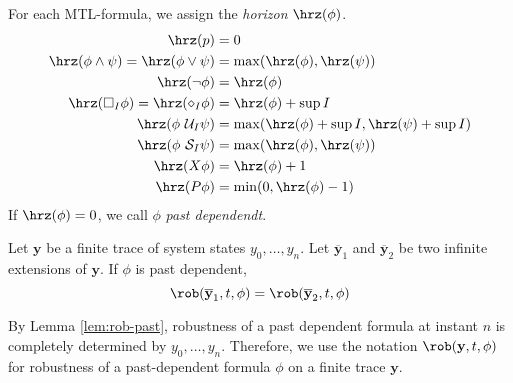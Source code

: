 \begin{definition}[Horizon]
  For each MTL-formula, we assign the \emph{horizon} $\hrz(\phi)$.
  \begin{align}
    \hrz(p) &= 0\\
    \hrz(\phi \wedge \psi) = \hrz(\phi \vee \psi) &= \max(\hrz(\phi), \hrz(\psi))\\
    \hrz(\neg \phi) &= \hrz(\phi)\\
    \hrz(\square_I \phi) = \hrz(\diamond_I \phi) &= \hrz(\phi) + \sup I\\
    \hrz(\phi \ \mathcal{U}_I \psi) &= \max(\hrz(\phi) + \sup I, \hrz(\psi) + \sup I)\\
    \hrz(\phi \ \mathcal{S}_I \psi) &= \max(\hrz(\phi), \hrz(\psi))\\
    \hrz(X\phi) &= \hrz(\phi) + 1\\
    \hrz(P\phi) &= \min(0, \hrz(\phi) - 1)
  \end{align}
  If $\hrz(\phi) = 0$, we call $\phi$ \emph{past dependendt}.
\end{definition}

\begin{lemma}\label{lem:rob-past}
  Let $\mathbf{y}$ be a finite trace of system states $y_0, \ldots, y_n$.
  Let $\overline{\mathbf{y}}_1$ and $\overline{\mathbf{y}}_2$ be two infinite extensions of $\mathbf{y}$.
  If $\phi$ is past dependent,
  \begin{equation}
    \rob(\overline{\mathbf{y}}_1, t, \phi) = \rob(\overline{\mathbf{y}}_2, t, \phi)
  \end{equation}
\end{lemma}

By Lemma \ref{lem:rob-past}, robustness of a past dependent formula at instant $n$ is completely determined by $y_0, \ldots, y_n$.
Therefore, we use the notation $\rob(\mathbf{y}, t, \phi)$ for robustness of a past-dependent formula $\phi$ on a finite trace $\mathbf{y}$.
